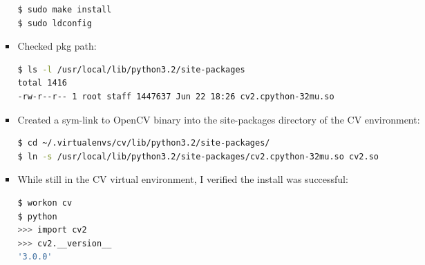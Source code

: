 \documentclass[journal, a4paper]{IEEEtran}
\begin{document}
\begin{itemize}
\begin{itemize}
\begin{itemize}
\begin{lstlisting}[language=bash]
$ sudo make install
$ sudo ldconfig
			\end{lstlisting}
            \item Checked pkg path:
            \begin{lstlisting}[language=bash]
$ ls -l /usr/local/lib/python3.2/site-packages
total 1416
-rw-r--r-- 1 root staff 1447637 Jun 22 18:26 cv2.cpython-32mu.so
			\end{lstlisting}
            \item Created a sym-link to OpenCV binary into the site-packages directory of the CV environment:
            \begin{lstlisting}[language=bash]
$ cd ~/.virtualenvs/cv/lib/python3.2/site-packages/
$ ln -s /usr/local/lib/python3.2/site-packages/cv2.cpython-32mu.so cv2.so
			\end{lstlisting}
            \item While still in the CV virtual environment, I verified the install was successful:
            \begin{lstlisting}[language=bash]
$ workon cv
$ python
>>> import cv2
>>> cv2.__version__
'3.0.0'
			\end{lstlisting}
            
		\end{itemize}
	\end{itemize}
\end{itemize}



















\end{document}
